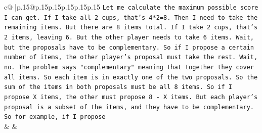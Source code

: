 \documentclass{article}
\begin{document}
{\begin{supertabular}{c@{$\;$}|p{.15\linewidth}@{}p{.15\linewidth}p{.15\linewidth}p{.15\linewidth}p{.15\linewidth}p{.15\linewidth}}
{{{\texttt{Let me calculate the maximum possible score I can get. If I take all 2 cups, that's 4*2=8. Then I need to take the remaining items. But there are 8 items total. If I take 2 cups, that's 2 items, leaving 6. But the other player needs to take 6 items. Wait, but the proposals have to be complementary. So if I propose a certain number of items, the other player's proposal must take the rest. Wait, no. The problem says "complementary" meaning that together they cover all items. So each item is in exactly one of the two proposals. So the sum of the items in both proposals must be all 8 items. So if I propose X items, the other must propose 8 {-} X items. But each player's proposal is a subset of the items, and they have to be complementary. So for example, if I propose} \\
            }
        }
    }
    & & \\ \\


\end{supertabular}}
\end{document}
